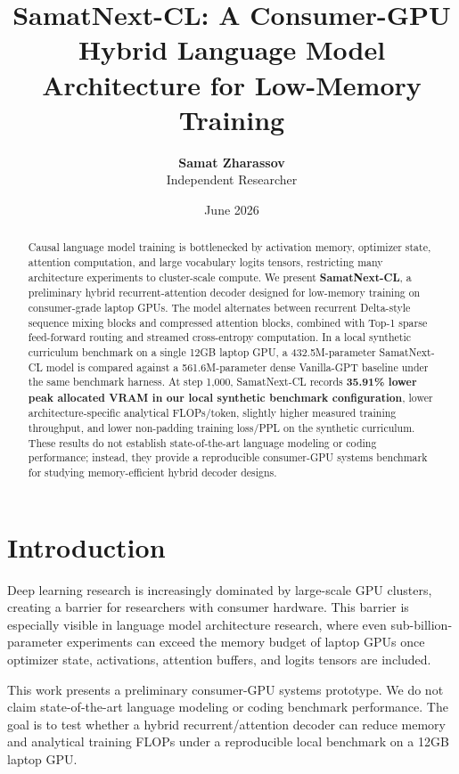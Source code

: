 \documentclass[11pt,a4paper]{article}
\title{\textbf{SamatNext-CL: A Consumer-GPU Hybrid Language Model Architecture for Low-Memory Training}}
\author{\textbf{Samat Zharassov} \\ \small{Independent Researcher}}
\date{June 2026}
\begin{document}
\maketitle

\begin{abstract}
Causal language model training is bottlenecked by activation memory, optimizer state, attention computation, and large vocabulary logits tensors, restricting many architecture experiments to cluster-scale compute. We present \textbf{SamatNext-CL}, a preliminary hybrid recurrent-attention decoder designed for low-memory training on consumer-grade laptop GPUs. The model alternates between recurrent Delta-style sequence mixing blocks and compressed attention blocks, combined with Top-1 sparse feed-forward routing and streamed cross-entropy computation. In a local synthetic curriculum benchmark on a single 12GB laptop GPU, a 432.5M-parameter SamatNext-CL model is compared against a 561.6M-parameter dense Vanilla-GPT baseline under the same benchmark harness. At step 1,000, SamatNext-CL records \textbf{35.91\% lower peak allocated VRAM in our local synthetic benchmark configuration}, lower architecture-specific analytical FLOPs/token, slightly higher measured training throughput, and lower non-padding training loss/PPL on the synthetic curriculum. These results do not establish state-of-the-art language modeling or coding performance; instead, they provide a reproducible consumer-GPU systems benchmark for studying memory-efficient hybrid decoder designs.
\end{abstract}

\section{Introduction}
Deep learning research is increasingly dominated by large-scale GPU clusters, creating a barrier for researchers with consumer hardware. This barrier is especially visible in language model architecture research, where even sub-billion-parameter experiments can exceed the memory budget of laptop GPUs once optimizer state, activations, attention buffers, and logits tensors are included.

This work presents a preliminary consumer-GPU systems prototype. We do not claim state-of-the-art language modeling or coding benchmark performance. The goal is to test whether a hybrid recurrent/attention decoder can reduce memory and analytical training FLOPs under a reproducible local benchmark on a 12GB laptop GPU.
\end{document}
